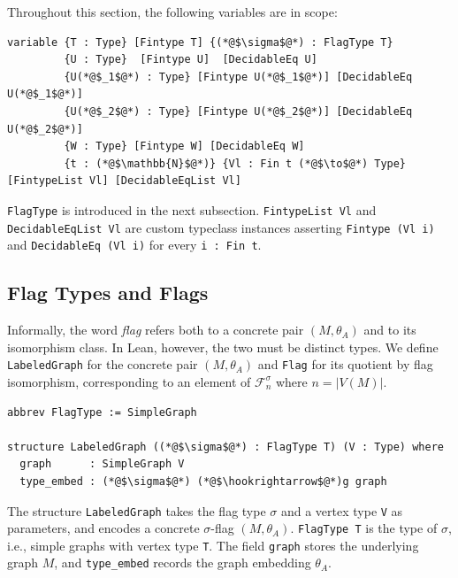 \documentclass{article}
\newcommand{\lean}[1]{\texttt{#1}}
\begin{document}
Throughout this section, the following variables are in scope:
\begin{lstlisting}
variable {T : Type} [Fintype T] {(*@$\sigma$@*) : FlagType T}
         {U : Type}  [Fintype U]  [DecidableEq U]
         {U(*@$_1$@*) : Type} [Fintype U(*@$_1$@*)] [DecidableEq U(*@$_1$@*)]
         {U(*@$_2$@*) : Type} [Fintype U(*@$_2$@*)] [DecidableEq U(*@$_2$@*)]
         {W : Type} [Fintype W] [DecidableEq W]
         {t : (*@$\mathbb{N}$@*)} {Vl : Fin t (*@$\to$@*) Type} [FintypeList Vl] [DecidableEqList Vl]
\end{lstlisting}
\lean{FlagType} is introduced in the next subsection.
\lean{FintypeList Vl} and \lean{DecidableEqList Vl} are custom typeclass instances
asserting \lean{Fintype (Vl i)} and \lean{DecidableEq (Vl i)} for every \lean{i : Fin t}.

\subsection{Flag Types and Flags}

Informally, the word \emph{flag} refers both to a concrete pair $(M,\theta_A)$
and to its isomorphism class.  In Lean, however, the two must be distinct types.  We define \lean{LabeledGraph}
for the concrete pair $(M,\theta_A)$ and \lean{Flag} for its quotient by flag
isomorphism, corresponding to an element of $\mathcal{F}^\sigma_n$ where $n = |V(M)|$.

\begin{lstlisting}
abbrev FlagType := SimpleGraph

structure LabeledGraph ((*@$\sigma$@*) : FlagType T) (V : Type) where
  graph      : SimpleGraph V
  type_embed : (*@$\sigma$@*) (*@$\hookrightarrow$@*)g graph
\end{lstlisting}
The structure \lean{LabeledGraph} takes the flag type $\sigma$ and a vertex type \lean{V} as parameters, and encodes a concrete $\sigma$-flag $(M,\theta_A)$. \lean{FlagType T} is the type of $\sigma$, i.e., simple graphs with vertex type \lean{T}. The field \lean{graph} stores the underlying graph $M$, and \lean{type\_embed} records the graph embedding $\theta_A$.
\end{document}
